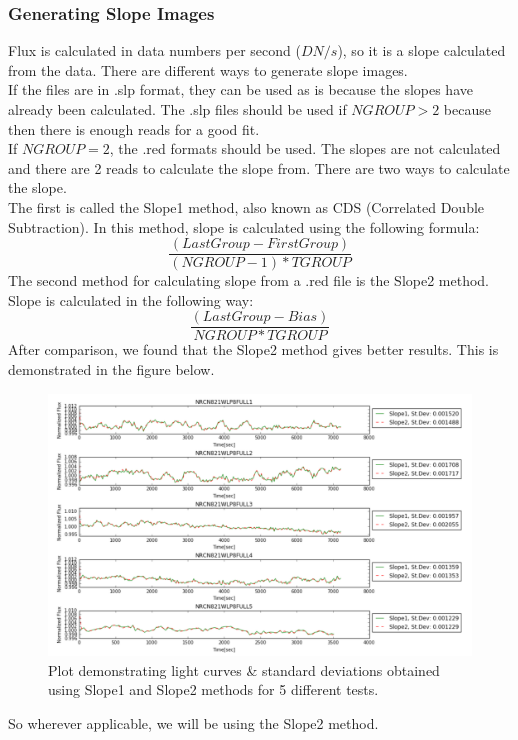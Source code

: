 \documentclass[conference]{IEEEtran}
\begin{document}
\subsubsection{Generating Slope Images}
Flux is calculated in data numbers per second ($DN/s$), so it is a slope calculated from the data. There are different ways to generate slope images.\\
If the files are in .slp format, they can be used as is because the slopes have already been calculated. The .slp files should be used if $NGROUP > 2$ because then there is enough reads for a good fit.\\
If $NGROUP = 2$, the .red formats should be used. The slopes are not calculated and there are 2 reads to calculate the slope from. There are two ways to calculate the slope.\\
The first is called the Slope1 method, also known as CDS (Correlated Double Subtraction). In this method, slope is calculated using the following formula:
$$\frac{(Last Group - First Group)}{(NGROUP-1)*TGROUP}$$
The second method for calculating slope from a .red file is the Slope2 method. Slope is calculated in the following way:
$$\frac{(Last Group - Bias)}{NGROUP*TGROUP}$$
After comparison, we found that the Slope2 method gives better results. This is demonstrated in the figure below.
\begin{figure}[H]
\includegraphics[scale=0.35]{Slopes}
\caption{Plot demonstrating light curves \& standard deviations obtained using Slope1 and Slope2 methods for 5 different tests.}
\label{fig:slopes}
\end{figure}
So wherever applicable, we will be using the Slope2 method.   
\end{document}
